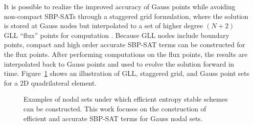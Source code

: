 \documentclass[review,onefignum,onetabnum,final]{siamart171218}
\begin{document}
It is possible to realize the improved accuracy of Gauss points while avoiding non-compact SBP-SATs through a staggered grid formulation, where the solution is stored at Gauss nodes but interpolated to a set of higher degree $(N+2)$ GLL ``flux'' points for computation \cite{parsani2016entropy}.  Because GLL nodes include boundary points, compact and high order accurate SBP-SAT terms can be constructed for the flux points.  After performing computations on the flux points, the results are interpolated back to Gauss points and used to evolve the solution forward in time.  Figure~\ref{fig:nodesets} shows an illustration of GLL, staggered grid, and Gauss point sets for a 2D quadrilateral element.  

\begin{figure}
\centering
{}
\hspace{.5em}
\hspace{.5em}
\caption{Examples of nodal sets under which efficient entropy stable schemes can be constructed.  This work focuses on the construction of efficient and accurate SBP-SAT terms for Gauss nodal sets.}
\label{fig:nodesets}
\end{figure}
\end{document}
